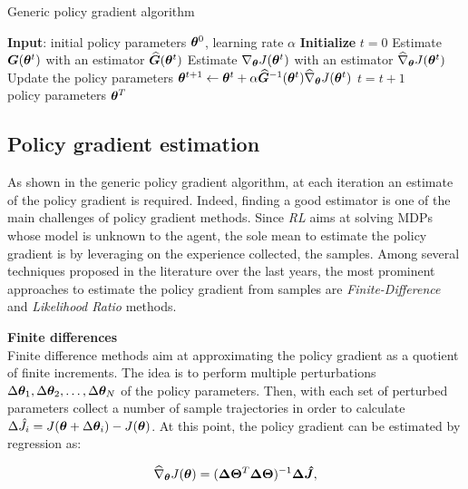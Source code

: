 \begin{algorithm}[t]
	\caption{Generic policy gradient algorithm}
	\label{alg:PG}
	\begin{algorithmic}[1]
	\State \textbf{Input}: initial policy parameters $\boldsymbol{\theta}^0$, learning rate $\alpha$
	\State \textbf{Initialize} $t=0$
		\State Estimate $\boldsymbol{G}(\boldsymbol{\theta}^t)$ with an estimator $\widehat{\boldsymbol{G}}(\boldsymbol{\theta}^t)$
		\State Estimate $\nabla_{\boldsymbol{\theta}}J(\boldsymbol{\theta}^t)$ with an estimator $\widehat{\nabla}_{\boldsymbol{\theta}}J(\boldsymbol{\theta}^t)$ \label{step:PGestimation}
		\State Update the policy parameters $\boldsymbol{\theta}^{t+1} \leftarrow \boldsymbol{\theta}^t+\alpha\widehat{\boldsymbol{G}}^{-1}(\boldsymbol{\theta}^t)\widehat{\nabla}_{\boldsymbol{\theta}}J(\boldsymbol{\theta}^t)$
		\State $t=t+1$
	\EndWhile \\
	\Return policy parameters $\boldsymbol{\theta}^{T}$
	\end{algorithmic}
\end{algorithm}

\subsection{Policy gradient estimation}
As shown in the generic policy gradient algorithm, at each iteration an estimate of the policy gradient is required. Indeed, finding a good estimator is one of the main challenges of policy gradient methods. Since \emph{RL} aims at solving \gls{MDP}s  whose model is unknown to the agent, the sole mean to estimate the policy gradient is by leveraging on the experience collected, \ie the samples. Among several techniques proposed in the literature over the last years, the most prominent approaches to estimate the policy gradient from samples are \emph{Finite-Difference} and \emph{Likelihood Ratio} methods\cite{glynn1990likelihood}.

\textbf{Finite differences}\\
Finite difference methods aim at approximating the policy gradient as a quotient of finite increments. The idea is to perform multiple perturbations $\Delta\boldsymbol{\theta}_1,\Delta\boldsymbol{\theta}_2, \dots, \Delta\boldsymbol{\theta}_N$ of the policy parameters. Then, with each set of perturbed parameters collect a number of sample trajectories in order to calculate $\Delta\hat{J}_i=J(\boldsymbol{\theta}+\Delta\boldsymbol{\theta}_i)-J(\boldsymbol{\theta})$. At this point, the policy gradient can be estimated by regression as:

\begin{align}
\widehat{\nabla}_{\boldsymbol{\theta}}J(\boldsymbol{\theta})=(\boldsymbol{\Delta\Theta}^T\boldsymbol{\Delta\Theta})^{-1}\boldsymbol{\Delta\hat{J}},
\end{align}

